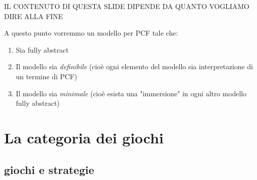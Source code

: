\documentclass{beamer}
\begin{document}
\begin{frame}
	
	IL CONTENUTO DI QUESTA SLIDE DIPENDE DA QUANTO VOGLIAMO DIRE ALLA FINE
	
	A questo punto vorremmo un modello per PCF tale che:
	\begin{enumerate}
		\item Sia fully abstract
		\item Il modello sia \emph{definibile} (cioè ogni elemento del modello sia interpretazione di un termine di PCF)
		\item Il modello sia \emph{minimale} (cioè esista una "immersione" in ogni altro modello fully abstract)
	\end{enumerate}
	
	

\end{frame}






\section{La categoria dei giochi}


\subsection{giochi e strategie}
\end{document}
